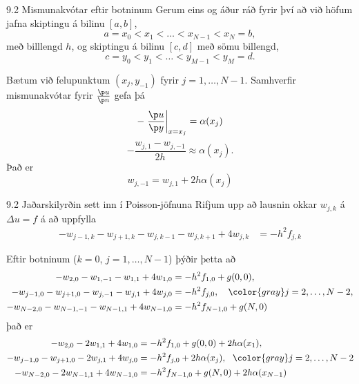 \begin{frame}{9.2 Mismunakvótar eftir botninum}
 Gerum eins og áður ráð fyrir því að við höfum jafna skiptingu á bilinu $[a,b]$,
 $$
  a = x_0 < x_1 < \ldots < x_{N-1} < x_N = b,
 $$
 með billlengd $h$, \pause og skiptingu á bilinu $[c,d]$ með sömu billengd,
 $$
  c = y_0 < y_1 < \ldots < y_{M-1} < y_M = d.
 $$
 \pause
 
 Bætum við felupunktum $(x_j,y_{-1})$ fyrir $j=1,\ldots,N-1$. \pause
 Samhverfir mismunakvótar fyrir $\frac{\p u}{\p n}$ gefa þá
 $$
  - \left. \frac{\p u}{\p y} \right|_{x=x_j} = \alpha(x_j) 
 $$
 $$
  -\frac{w_{j,1} - w_{j,-1} }{2h} \approx \alpha(x_j).
  $$
  Það er 
  $$
    w_{j,-1}  = w_{j,1} + 2h\alpha(x_j)
  $$
\end{frame}

\begin{frame}{9.2 Jaðarskilyrðin sett inn í Poisson-jöfnuna}
 Rifjum upp að lausnin  okkar $w_{j,k}$ á $\Delta u = f$ á að uppfylla
 \begin{align*}
 -w_{j-1,k} - w_{j+1,k} - w_{j,k-1} - w_{j,k+1} + 4w_{j,k} &= -h^2 f_{j,k} 
 \end{align*}
 
 Eftir botninum ($k=0$, $j=1,\ldots,N-1$) þýðir þetta að 
 \begin{align*}
  - w_{2,0} - w_{1,-1} - w_{1,1} + 4w_{1,0} &= -h^2 f_{1,0} + g(0,0),\\
  -w_{j-1,0} - w_{j+1,0} - w_{j,-1} - w_{j,1} + 4w_{j,0} &= -h^2 f_{j,0}, 
  \quad {\color{gray} j=2,\ldots,N-2},\\
  -w_{N-2,0}  - w_{N-1,-1} - w_{N-1,1} + 4w_{N-1,0} &= -h^2 f_{N-1,0} + g(N,0) 
 \end{align*} \pause
 það er
\begin{align*}
- w_{2,0}  - 2w_{1,1} + 4w_{1,0} &= -h^2 f_{1,0} + g(0,0) + 2h\alpha(x_1),\\
  -w_{j-1,0} - w_{j+1,0} - 2w_{j,1} + 4w_{j,0} &= -h^2 f_{j,0} + 2h\alpha(x_j), 
   \ \ {\color{gray} j=2,\ldots,N-2}\\
  -w_{N-2,0}  - 2w_{N-1,1} + 4w_{N-1,0} &= -h^2 f_{N-1,0} + g(N,0) + 2h\alpha(x_{N-1})
 \end{align*} 
\end{frame}


